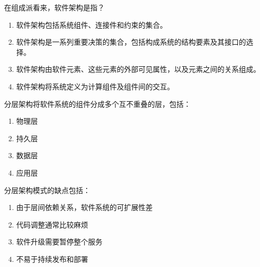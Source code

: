 \begin{problem}
	在组成派看来，软件架构是指？
        \begin{enumerate}[label=\Alph*.]
            \item 软件架构包括系统组件、连接件和约束的集合。
            \item 软件架构是一系列重要决策的集合，包括构成系统的结构要素及其接口的选择。
            \item 软件架构由软件元素、这些元素的外部可见属性，以及元素之间的关系组成。
            \item 软件架构将系统定义为计算组件及组件间的交互。
        \end{enumerate}
\end{problem}



\begin{problem}
	分层架构将软件系统的组件分成多个互不重叠的层，包括：
    \vspace{-0.8em}
    \begin{multicols}{4}
        \begin{enumerate}[label=\Alph*.]
            \item 物理层
            \item 持久层
            \item 数据层
            \item 应用层
        \end{enumerate}
    \end{multicols}
    \vspace{-1em}
\end{problem}



\begin{problem}
	分层架构模式的缺点包括：
    \vspace{-0.8em}
    \begin{multicols}{2}
        \begin{enumerate}[label=\Alph*.]
            \item 由于层间依赖关系，软件系统的可扩展性差
            \item 代码调整通常比较麻烦
            \item 软件升级需要暂停整个服务
            \item 不易于持续发布和部署
        \end{enumerate}
    \end{multicols}
    \vspace{-1em}
\end{problem}



